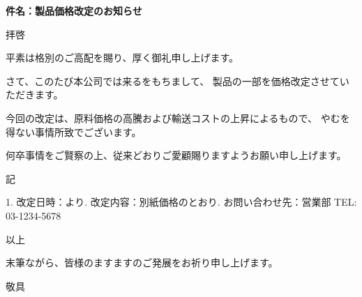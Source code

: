 \documentclass[14pt]{jlreq}
\makeatletter
\def\@letterSubject{製品価格改定のお知らせ}
\makeatother
\begin{document}
\makeLetterHeader

\makeRecipientBlock

\par
\textbf{件名：\@letterSubject}
\par
\vspace{1zh}

\begin{letter}

拝啓\@par
\@seasonGreeting\@par
\par
平素は格別のご高配を賜り、厚く御礼申し上げます。\@par
\par

さて、このたび本公司では来る\@letterDate をもちまして、
製品の一部を価格改定させていただきます。\@par
\par
{}
今回の改定は、原料価格の高騰および輸送コストの上昇によるもので、
やむを得ない事情所致でございます。\@par
\par
何卒事情をご賢察の上、従来どおりご愛顧賜りますようお願い申し上げます。\@par
\par
記\@par
\par
1. 改定日時：\@letterDate より. 改定内容：別紙価格のとおり. お問い合わせ先：営業部 TEL: 03-1234-5678\@par
\par
以上\@par

\par
末筆ながら、皆様のますますのご発展をお祈り申し上げます。\@par
\par

敬具\@par

\makeSignature

\end{letter}
\end{document}

